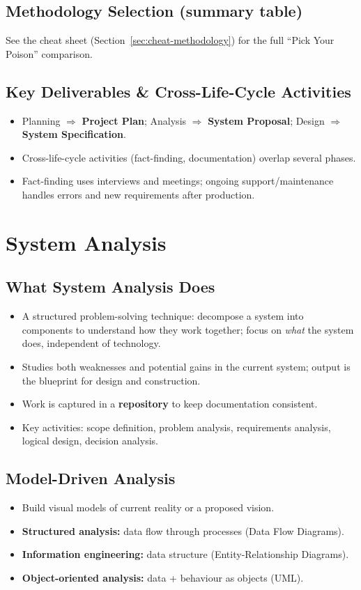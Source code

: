 \documentclass[hidelinks]{article}
\begin{document}
\subsection{Methodology Selection (summary table)}
See the cheat sheet (Section~\ref{sec:cheat-methodology}) for the full ``Pick Your Poison'' comparison.

\subsection{Key Deliverables \& Cross-Life-Cycle Activities}
\begin{itemize}
  \item Planning $\Rightarrow$ \textbf{Project Plan}; Analysis $\Rightarrow$ \textbf{System Proposal};
        Design $\Rightarrow$ \textbf{System Specification}.
  \item Cross-life-cycle activities (fact-finding, documentation) overlap several phases.
  \item Fact-finding uses interviews and meetings; ongoing support/maintenance handles errors
        and new requirements after production.
\end{itemize}

\section{System Analysis}

\subsection{What System Analysis Does}
\begin{itemize}
  \item A structured problem-solving technique: decompose a system into components to understand
        how they work together; focus on \emph{what} the system does, independent of technology.
  \item Studies both weaknesses and potential gains in the current system; output is the blueprint
        for design and construction.
  \item Work is captured in a \textbf{repository} to keep documentation consistent.
  \item Key activities: scope definition, problem analysis, requirements analysis, logical design,
        decision analysis.
\end{itemize}

\subsection{Model-Driven Analysis}
\begin{itemize}
  \item Build visual models of current reality or a proposed vision.
  \item \textbf{Structured analysis:} data flow through processes (Data Flow Diagrams).
  \item \textbf{Information engineering:} data structure (Entity-Relationship Diagrams).
  \item \textbf{Object-oriented analysis:} data + behaviour as objects (UML).
\end{itemize}
\end{document}
